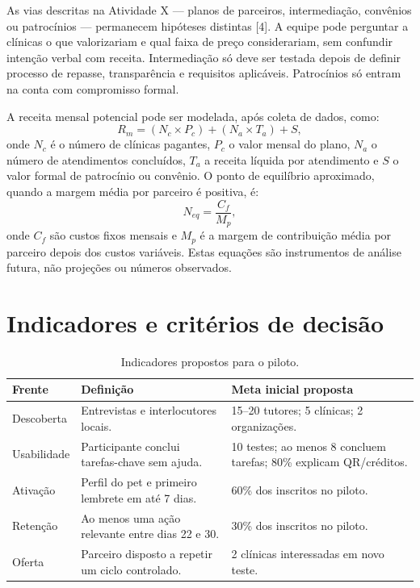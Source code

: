 \documentclass[12pt,a4paper]{article}
\begin{document}
As vias descritas na Atividade X — planos de parceiros, intermediação, convênios ou patrocínios — permanecem hipóteses distintas [4]. A equipe pode perguntar a clínicas o que valorizariam e qual faixa de preço considerariam, sem confundir intenção verbal com receita. Intermediação só deve ser testada depois de definir processo de repasse, transparência e requisitos aplicáveis. Patrocínios só entram na conta com compromisso formal.

A receita mensal potencial pode ser modelada, após coleta de dados, como:
\[
R_m = (N_c \times P_c) + (N_a \times T_a) + S,
\]
onde $N_c$ é o número de clínicas pagantes, $P_c$ o valor mensal do plano, $N_a$ o número de atendimentos concluídos, $T_a$ a receita líquida por atendimento e $S$ o valor formal de patrocínio ou convênio. O ponto de equilíbrio aproximado, quando a margem média por parceiro é positiva, é:
\[
N_{eq} = \frac{C_f}{M_p},
\]
onde $C_f$ são custos fixos mensais e $M_p$ é a margem de contribuição média por parceiro depois dos custos variáveis. Estas equações são instrumentos de análise futura, não projeções ou números observados.

\section{Indicadores e critérios de decisão}

\begin{table}[htbp]\centering\small
\caption{Indicadores propostos para o piloto.}
\begin{tabularx}{\textwidth}{P{2.4cm}YY}
\toprule\textbf{Frente} & \textbf{Definição} & \textbf{Meta inicial proposta}\\\midrule
Descoberta & Entrevistas e interlocutores locais. & 15--20 tutores; 5 clínicas; 2 organizações.\\
Usabilidade & Participante conclui tarefas-chave sem ajuda. & 10 testes; ao menos 8 concluem tarefas; 80\% explicam QR/créditos.\\
Ativação & Perfil do pet e primeiro lembrete em até 7 dias. & 60\% dos inscritos no piloto.\\
Retenção & Ao menos uma ação relevante entre dias 22 e 30. & 30\% dos inscritos no piloto.\\
Oferta & Parceiro disposto a repetir um ciclo controlado. & 2 clínicas interessadas em novo teste.\\
\bottomrule\end{tabularx}\end{table}
\end{document}
